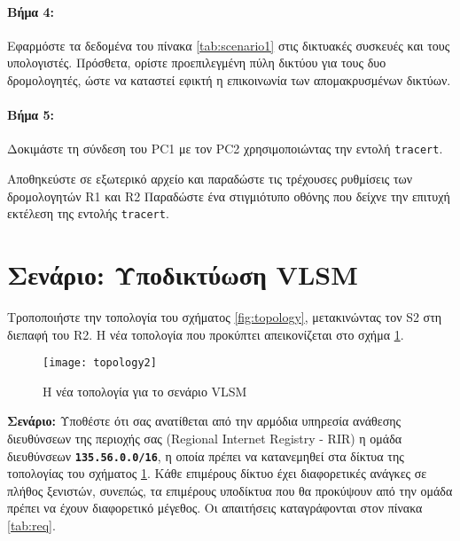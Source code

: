 \documentclass{EdipyLabs} %
\begin{document}
\paragraph{Βήμα 4:} Εφαρμόστε τα δεδομένα του πίνακα \ref{tab:scenario1} στις δικτυακές συσκευές και τους υπολογιστές. Πρόσθετα, ορίστε προεπιλεγμένη πύλη δικτύου για τους δυο δρομολογητές, ώστε να καταστεί εφικτή η επικοινωνία των απομακρυσμένων δικτύων.

\paragraph{Βήμα 5:} Δοκιμάστε τη σύνδεση του PC1 με τον PC2 χρησιμοποιώντας την εντολή \texttt{tracert}.

\begin{assignmentbox}
		 Αποθηκεύστε σε εξωτερικό αρχείο και παραδώστε τις τρέχουσες ρυθμίσεις των δρομολογητών R1 και R2
		 Παραδώστε ένα στιγμιότυπο οθόνης που δείχνε την επιτυχή εκτέλεση της εντολής \texttt{tracert}.
\end{assignmentbox}

\newpage

\section{Σενάριο: Υποδικτύωση VLSM}

Τροποποιήστε την τοπολογία του σχήματος \ref{fig:topology}, μετακινώντας τον S2 στη διεπαφή  του R2. H νέα τοπολογία που προκύπτει απεικονίζεται στο σχήμα \ref{fig:topology2}.

\begin{figure}[ht]
	\centering
	\texttt{[image: topology2]}
	\caption{Η νέα τοπολογία για το σενάριο VLSM}\label{fig:topology2}
\end{figure}

\textbf{Σενάριο:} Υποθέστε ότι σας ανατίθεται από την αρμόδια υπηρεσία ανάθεσης διευθύνσεων της περιοχής σας (Regional Internet Registry - RIR) η ομάδα διευθύνσεων \textbf{\texttt{135.56.0.0/16}}, η οποία πρέπει να κατανεμηθεί στα δίκτυα της τοπολογίας του σχήματος \ref{fig:topology2}. Κάθε επιμέρους δίκτυο έχει διαφορετικές ανάγκες σε πλήθος ξενιστών, συνεπώς, τα επιμέρους υποδίκτυα που θα προκύψουν από την ομάδα  πρέπει να έχουν διαφορετικό μέγεθος. Οι απαιτήσεις καταγράφονται στον πίνακα \ref{tab:req}.
\end{document}

